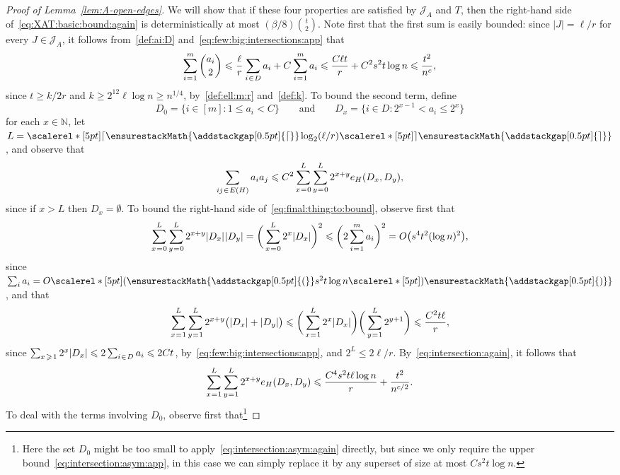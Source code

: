 \documentclass[12pt,reqno]{amsart}
\newcommand\pig[1]{\scalerel*[5pt]{\normalsize#1}{%
  \ensurestackMath{\addstackgap[0.5pt]{\normalsize#1}}}}
\theoremstyle{remark}
\numberwithin{theorem}{section}
\renewcommand{\(}{\bigl(}
\renewcommand{\)}{\bigr)\vphantom{)}}
\newcommand{\gap}{\hspace{0.02cm}}
\newcommand{\ina}{\hspace{0.02cm}\in\hspace{0.02cm}}
\newcommand{\gea}{\hspace{0.035cm} \ge \hspace{0.03cm}}
\newcommand{\eqa}{\hspace{0.02cm}=\hspace{0.015cm}}
\newcommand{\cJ}{\mathcal J}
\renewcommand{\le}{\leqslant}
\renewcommand{\ge}{\geqslant}
\newcommand{\N}{\mathbb N}
\begin{document}
\begin{proof}[Proof of Lemma~\ref{lem:A-open-edges}]
We will show that if these four properties are satisfied by $\cJ_A$ and $T$, then the right-hand side of~\eqref{eq:XAT:basic:bound:again} is deterministically at most $(\beta/8) {t \choose 2}$. Note first that the first sum %
is easily bounded: since $|J| = \ell/r$ for every $J \in \cJ_A$, it follows from~\eqref{def:ai:D} and~\eqref{eq:few:big:intersections:app} that 
\begin{equation}\label{eq:XAT:bound1} 
\sum_{i \eqa 1}^m {a_i \choose 2} \le \gap \frac{\ell}{r} \gap \sum_{i \ina D} a_i + C \gap \sum_{i \eqa 1}^m a_i \le \frac{C \ell t}{r} + C^2 s^2 t \log n \le \frac{t^2}{n^c},
\end{equation}
since $t \ge k/2r$ and $k \ge 2^{12} \ell \log n \ge n^{1/4}$, by~\eqref{def:ell:m:r} and~\eqref{def:k}. To bound the second term, define
$$
D_0 = \big\{ i \in [m] : 1 \le a_i < C \big\} \qquad \text{and} \qquad D_x = \big\{ i \in D : 2^{x - 1} < a_i \le 2^x \big\}
$$
for each $x \in \N$, let $L = \pig\lceil \hspace{-0.02cm} \log_2(\ell/r) \hspace{0.01cm} \pig\rceil$, and observe that 
\begin{equation}\label{eq:final:thing:to:bound}
\sum_{ij \ina E(H)} a_i a_j \le C^2 \sum_{x \eqa 0}^L \sum_{y \eqa 0}^L 2^{x + y} e_H(D_x, D_y),
\end{equation}
since if $x > L$ then $D_x = \emptyset$. To bound the right-hand side of~\eqref{eq:final:thing:to:bound}, observe first that 
\begin{equation}\label{eq:product:bound}
\sum_{x \eqa 0}^L \sum_{y \eqa 0}^L 2^{x + y} |D_x| \gap |D_y| = \bigg( \sum_{x \eqa 0}^L 2^x |D_x| \bigg)^2 \le \bigg( 2 \sum_{i \eqa 1}^m a_i \bigg)^2 = O\big( s^4 t^2 (\log n)^2 \big),
\end{equation}
since $\sum_i a_i = O\pig( s^2 t \log n \pig)$, and that 
$$\sum_{x \eqa 1}^L \sum_{y \eqa 1}^L 2^{x + y} \big( |D_x| + |D_y| \big) \le \bigg( \sum_{x \eqa 1}^L 2^x |D_x| \bigg) \bigg( \sum_{y \eqa 1}^L 2^{y + 1} \bigg) \le \frac{C^2 t \ell}{r},$$
since $\sum_{x \gea 1} 2^x |D_x| \le 2 \sum_{i \ina D} a_i \le 2Ct$, by~\eqref{eq:few:big:intersections:app}, and $2^L \le 2\ell/r$. By~\eqref{eq:intersection:again}, it follows that
\begin{equation}\label{eq:bounding:xy:not:zero}
\sum_{x \eqa 1}^L \sum_{y \eqa 1}^L 2^{x + y} e_H(D_x, D_y) \le \frac{C^4 s^2 t \ell \log n}{r} + \frac{t^2}{n^{c/2}}.
\end{equation}
To deal with the terms involving $D_0$, observe first that\footnote{Here the set $D_0$ might be too small to apply~\eqref{eq:intersection:asym:again} directly, but since we only require the upper bound~\eqref{eq:intersection:asym:app}, in this case we can simply replace it by any superset of size at most $C s^2 t \log n$.}   

\end{proof}
\end{document}
